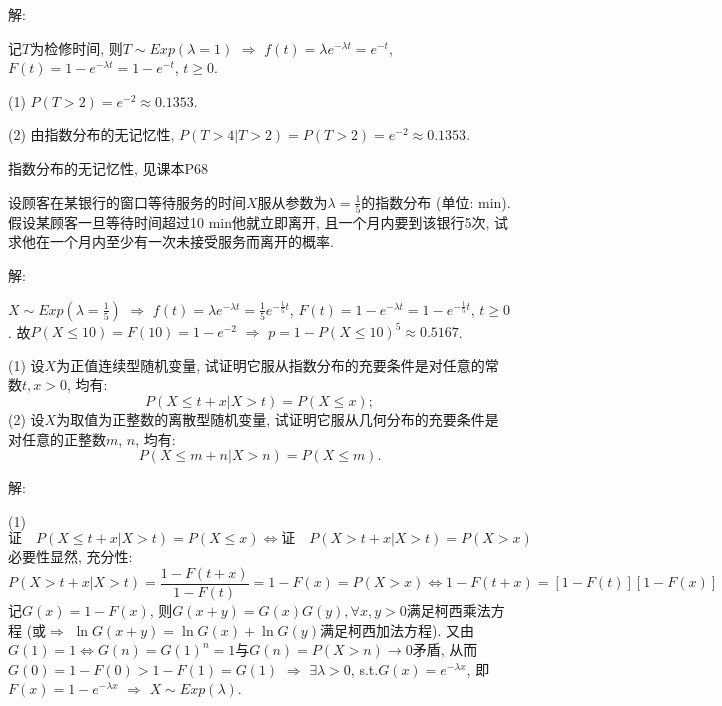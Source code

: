 \documentclass[standard]{ExBook}
\renewenvironment{shaded}{%
  \def\FrameCommand{\fboxsep=\FrameSep \colorbox{shadecolor}}%
  \MakeFramed{\advance\hsize-\width \FrameRestore}%
}{%
  \endMakeFramed
}
\begin{document}
\begin{qitems}
解: 

记$T$为检修时间, 则$T\sim Exp(\lambda=1)$ $\Longrightarrow$ $f(t)=\lambda e^{-\lambda t}=e^{-t}$, $F(t)=1-e^{-\lambda t}=1-e^{-t}$, $t\geq 0$. 

(1) $P(T>2)=e^{-2}\approx0.1353$.

(2) 由指数分布的无记忆性, $P(T>4|T>2)=P(T>2)=e^{-2}\approx0.1353$.

\textcolor{themeColor}{\selectfont {} 指数分布的无记忆性, 见课本P68}

\vspace{2.5cm-5em}

    \begin{bbox}
    \begin{shaded}
        \qitem
设顾客在某银行的窗口等待服务的时间$X$服从参数为$\lambda=\displaystyle\frac{1}{5}$的指数分布 (单位: min). 假设某顾客一旦等待时间超过10 min他就立即离开, 且一个月内要到该银行5次, 试求他在一个月内至少有一次未接受服务而离开的概率.
    \end{shaded}
    \end{bbox}

\vspace{\dimexpr2.5cm-5em\relax}

解: 

$X\sim Exp(\lambda=\frac{1}{5})$ $\Longrightarrow$ $f(t)=\lambda e^{-\lambda t}=\frac{1}{5}e^{-\frac{1}{5}t}$, $F(t)=1-e^{-\lambda t}=1-e^{-\frac{1}{5}t}$, $t\geq 0$. 故$P(X \leq 10)=F(10)=1-e^{-2}$ $\Longrightarrow$ $p=1-P(X \leq 10)^5\approx0.5167$.

\vspace{2.5cm-5em}

    \begin{bbox}
    \begin{shaded}
        \qitem
(1) 设$X$为正值连续型随机变量, 试证明它服从指数分布的充要条件是对任意的常数$t,x > 0$, 均有:
$$P(X \leq t+x|X>t)=P(X \leq x);$$
(2) 设$X$为取值为正整数的离散型随机变量, 试证明它服从几何分布的充要条件是对任意的正整数$m$, $n$, 均有:
$$P(X \leq m+n|X>n)=P(X \leq m).$$
    \end{shaded}
    \end{bbox}

\vspace{\dimexpr2.5cm-5em\relax}

解: 

(1)
$$\text{证}\quad P(X \leq t+x|X>t)=P(X \leq x) \Longleftrightarrow \text{证}\quad P(X > t+x|X>t)=P(X > x)$$
必要性显然, 充分性:
$$P(X > t+x|X>t)=\frac{1-F(t+x)}{1-F(t)}=1-F(x)=P(X>x) \Longleftrightarrow 1-F(t+x)=[1-F(t)][1-F(x)]$$
记$G(x)=1-F(x)$, 则$G(x+y)=G(x)G(y),\forall x,y>0$满足柯西乘法方程 (或$\Longrightarrow$ $\ln G(x+y)=\ln G(x)+\ln G(y)$满足柯西加法方程). 又由$G(1)=1 \Longleftrightarrow G(n)=G(1)^n=1$与$G(n) = P(X>n)\to 0$矛盾, 从而$G(0)=1-F(0)>1-F(1)=G(1)$ $\Longrightarrow$ $\exists\lambda>0$, s.t.$G(x)=e^{-\lambda x}$, 即$F(x)=1-e^{-\lambda x}$ $\Longrightarrow$ $X\sim Exp(\lambda)$.


\end{qitems}
\end{document}
